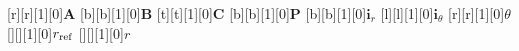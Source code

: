    [r][r][1][0]{$\mathbold{A}$}
   [b][b][1][0]{$\mathbold{B}$}
   [t][t][1][0]{$\mathbold{C}$}
   [b][b][1][0]{$\mathbold{P}$}
   [b][b][1][0]{$\mathbold{i}_r$}
   [l][l][1][0]{$\mathbold{i}_\theta$}
   [r][r][1][0]{$\theta$}
   [][][1][0]{$r_{\rm ref}$}
   [][][1][0]{$r$}

